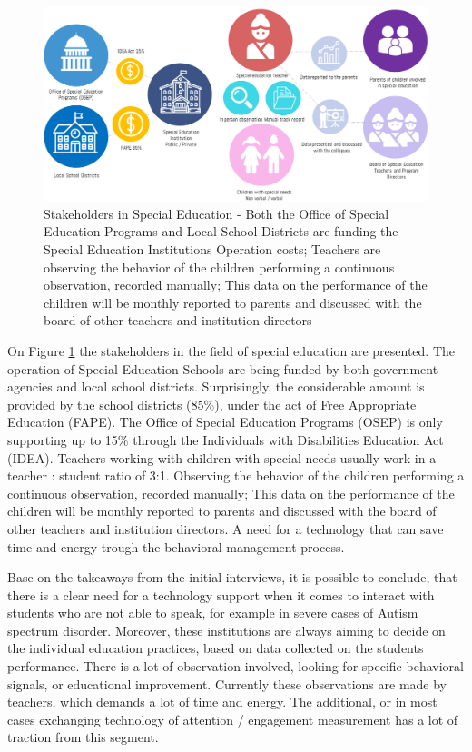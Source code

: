 \documentclass[letterpaper,10pt]{article}
\begin{document}
\begin{figure}[!htb]
\centering
\includegraphics[scale=0.5]{stakeholders_spec.png}
\caption[Stakeholders in Special Education]{Stakeholders in Special Education - Both the Office of Special Education Programs and Local School Districts are funding the Special Education Institutions Operation costs; Teachers are observing the behavior of the children performing a continuous observation, recorded manually; This data on the performance of the children will be monthly reported to parents and discussed with the board of other teachers and institution directors}
\label{img:stake_special}
\end{figure}


On Figure \ref{img:stake_special} the stakeholders in the field of special education are presented. The operation of Special Education Schools are being funded by both government agencies and local school districts. Surprisingly, the considerable amount is provided by the school districts (85\%), under the act of Free Appropriate Education (FAPE). \cite{spec_funding}The Office of Special Education Programs (OSEP) is only supporting up to 15\% through the Individuals with Disabilities Education Act (IDEA). \cite{special_grants} Teachers working with children with special needs usually work in a teacher : student ratio of 3:1. Observing the behavior of the children performing a continuous observation, recorded manually; This data on the performance of the children will be monthly reported to parents and discussed with the board of other teachers and institution directors. A need for a technology that can save time and energy trough the  behavioral management process. 


Base on the takeaways from the initial interviews, it is possible to conclude, that there is a clear need for a technology support when it comes to interact with students who are not able to speak, for example in severe cases of Autism spectrum disorder. Moreover, these institutions are always aiming to decide on the individual education practices, based on data collected on the students performance. There is a lot of observation involved, looking for specific behavioral signals, or educational improvement. Currently these observations are made by teachers, which demands a lot of time and energy. The additional, or in most cases exchanging technology of attention / engagement measurement has a lot of traction from this segment.
\end{document}
